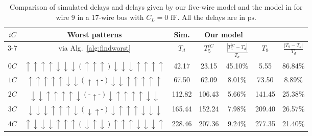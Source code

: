 \documentclass[10pt,journal]{IEEEtran}
\begin{document}
\begin{table*}
\caption{Comparison of simulated delays and delays given by our five-wire model and the model in \cite{Sot01} for wire 9 in a 17-wire bus with $C_L = 0$ $\mathrm{fF}$. All the delays are in $\mathrm{ps}$.}\label{tab:5}
\begin{center}
\begin{tabular}{|c|c|c|c|c|c|c|}
\hline
\multirow{3}{*}{$iC$} & Worst patterns & Sim. & \multicolumn{2}{c|}{Our model} & \multicolumn{2}{c|}{\cite{Sot01}} \\
\cline{3-7}
& via Alg.~\ref{alg:findworst} & $T_d$ & $T^{iC}_5$ & $\frac{|T^{iC}_5-T_d|}{T_d}$ & $T_9$ &  $\frac{|T_9-T_d|}{T_d}$ \\
\hline
$0C$ & $\uparrow \uparrow \uparrow \uparrow \downarrow \downarrow \downarrow (\uparrow \uparrow \uparrow) \downarrow \downarrow \downarrow \uparrow \uparrow \uparrow \uparrow$ & 42.17 &  23.15 & 45.10\% &  5.55  & 86.84\% \\
\hline
$1C$ & $\uparrow \uparrow \uparrow \uparrow \uparrow \downarrow \downarrow (\uparrow \uparrow \mbox{-}) \downarrow \downarrow \uparrow \uparrow \uparrow \uparrow \uparrow$ & 67.50 & 62.09 & 8.01\% & 73.50  & 8.89\% \\
\hline
$2C$ & $\downarrow \downarrow \uparrow \uparrow \uparrow \uparrow \downarrow (\mbox{-} \uparrow \mbox{-}) \downarrow \uparrow \uparrow \uparrow \uparrow \downarrow \downarrow$ & 112.82 & 106.43 &  5.66\% & 141.45 & 25.38\% \\
\hline
$3C$ & $\downarrow \downarrow \downarrow \uparrow \uparrow \uparrow \downarrow (\downarrow \uparrow \mbox{-}) \downarrow \uparrow \uparrow \uparrow \downarrow \downarrow \downarrow$ & 165.44 & 152.24 &  7.98\% & 209.40 & 26.57\% \\
\hline
$4C$ & $\uparrow \downarrow \downarrow \downarrow \uparrow \uparrow \uparrow (\downarrow \uparrow \downarrow) \uparrow \uparrow \uparrow \downarrow \downarrow \downarrow \uparrow$ & 228.46 & 207.36 & 9.24\% & 277.35  & 21.40\% \\
\hline
\end{tabular}
\end{center}
\end{table*}
\end{document}
